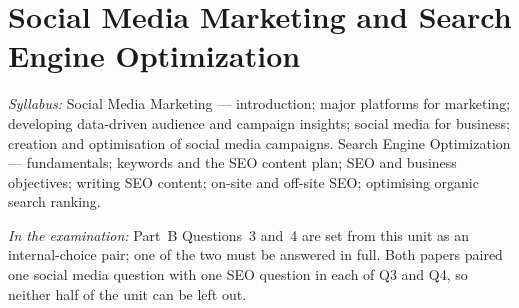 \chapter{Social Media Marketing and Search Engine Optimization}

\textit{Syllabus:} Social Media Marketing --- introduction; major platforms for
marketing; developing data-driven audience and campaign insights; social media
for business; creation and optimisation of social media campaigns. Search
Engine Optimization --- fundamentals; keywords and the SEO content plan; SEO and
business objectives; writing SEO content; on-site and off-site SEO; optimising
organic search ranking.

\textit{In the examination:} Part~B Questions~3 and~4 are set from this unit as
an internal-choice pair; one of the two must be answered in full. Both papers
paired one social media question with one SEO question in each of Q3 and Q4, so
neither half of the unit can be left out.

\parta

